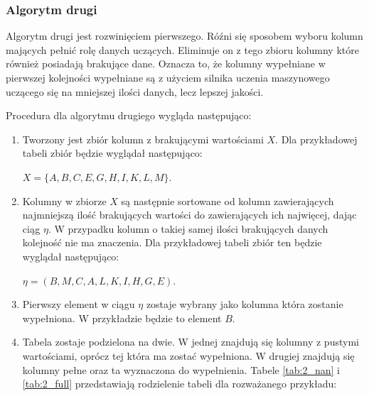 \documentclass[12pt,twoside]{article}
\begin{document}
\subsubsection{Algorytm drugi}

Algorytm drugi jest rozwinięciem pierwszego. Róźni się sposobem wyboru kolumn mających pełnić rolę
danych uczących. Eliminuje on z tego zbioru kolumny które również posiadają brakujące dane.
Oznacza to, że kolumny wypełniane w pierwszej kolejności wypełniane są z użyciem silnika uczenia maszynowego
uczącego się na mniejszej ilości danych, lecz lepszej jakości.

Procedura dla algorytmu drugiego wygląda następująco:

\begin{enumerate}[label=\arabic*), leftmargin=1.25cm]
    \item Tworzony jest zbiór kolumn z brakującymi wartościami $X$.
          Dla przykładowej tabeli zbiór będzie wyglądał następująco:

          $X=\{A,B,C,E,G,H,I,K,L,M\}$.
    \item Kolumny w zbiorze $X$ są następnie sortowane od kolumn zawierających
          najmniejszą ilość brakujących wartości do zawierających ich najwięcej, dając ciąg $\eta$.
          W przypadku kolumn o takiej samej ilości brakujących danych kolejność nie ma znaczenia.
          Dla przykładowej tabeli zbiór ten będzie wyglądał następująco:

          $\eta=(B,M,C,A,L,K,I,H,G,E)$.
    \item Pierwszy element w ciągu $\eta$ zostaje wybrany jako kolumna która zostanie wypełniona.
          W przykładzie będzie to element $B$.
    \item Tabela zostaje podzielona na dwie. W jednej znajdują się kolumny z pustymi wartościami,
          oprócz tej która ma zostać wypełniona.
          W drugiej znajdują się kolumny pełne oraz ta wyznaczona do wypełnienia.
          Tabele \ref{tab:2_nan} i \ref{tab:2_full} przedstawiają rodzielenie tabeli dla rozważanego przykładu:


\end{enumerate}
\end{document}
